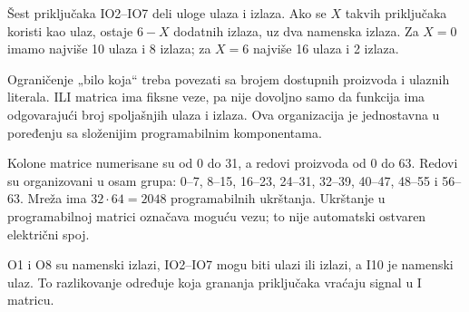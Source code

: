Šest priključaka IO2–IO7 deli uloge ulaza i izlaza. Ako se \(X\) takvih priključaka koristi kao ulaz, ostaje \(6-X\) dodatnih izlaza, uz dva namenska izlaza. Za \(X=0\) imamo najviše 10 ulaza i 8 izlaza; za \(X=6\) najviše 16 ulaza i 2 izlaza.

Ograničenje „bilo koja“ treba povezati sa brojem dostupnih proizvoda i ulaznih literala. ILI matrica ima fiksne veze, pa nije dovoljno samo da funkcija ima odgovarajući broj spoljašnjih ulaza i izlaza. Ova organizacija je jednostavna u poređenju sa složenijim programabilnim komponentama.

Kolone matrice numerisane su od 0 do 31, a redovi proizvoda od 0 do 63. Redovi su organizovani u osam grupa: 0–7, 8–15, 16–23, 24–31, 32–39, 40–47, 48–55 i 56–63. Mreža ima \(32\cdot64=2048\) programabilnih ukrštanja. Ukrštanje u programabilnoj matrici označava moguću vezu; to nije automatski ostvaren električni spoj.

O1 i O8 su namenski izlazi, IO2–IO7 mogu biti ulazi ili izlazi, a I10 je namenski ulaz. To razlikovanje određuje koja grananja priključaka vraćaju signal u I matricu.
